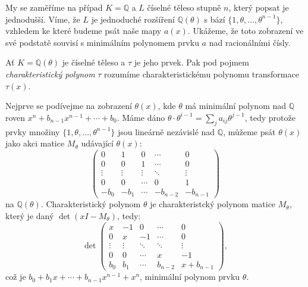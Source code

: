 \documentclass [12pt]{report}
\begin{document}
My se zaměříme na případ $K=\mathbb{Q}$ a $L$ číselné těleso stupně $n$, který popsat je jednodušší. Víme, že $L$ je jednoduché rozšíření $\mathbb{Q}(\theta)$ s bází $\lbrace 1,\theta,\dots,\theta^{n-1} \rbrace$, vzhledem ke které budeme psát naše mapy $a(x)$. Ukážeme, že toto zobrazení ve své podstatě souvisí s minimálním polynomem prvku $a$ nad racionálními čísly.

\begin{definice}
Ať $K = \mathbb{Q}(\theta)$ je číselné těleso a $\tau$ je jeho prvek. Pak pod pojmem \textit{charakteristický polynom} $\tau$ rozumíme charakteristickému polynomu transformace $\tau(x)$. 
\end{definice}

Nejprve se podívejme na zobrazení $\theta(x)$, kde $\theta$ má minimální polynom nad $\mathbb{Q}$ roven $x^n + b_{n-1} x^{n-1} + \cdots + b_0$. Máme dáno $\theta \cdot \theta^{i-1} = \sum_j a_{ij} \theta^{j-1}$, tedy protože prvky množiny $\lbrace 1,\theta,\dots,\theta^{n-1} \rbrace$ jsou lineárně nezávislé nad $\mathbb{Q}$, můžeme psát $\theta(x)$ jako akci matice $M_{\theta}$ udávající $\theta(x)$:
\begin{equation*}
 \begin{pmatrix}
0 & 1 & 0 & \cdots & 0\\
0 & 0 & 1 & \cdots & 0\\
\vdots & \vdots & \vdots & \ddots &\vdots\\
0 & 0 & \cdots & 0& 1\\
-b_0 & -b_1 & \cdots & -b_{n-2} & -b_{n-1}
\end{pmatrix} 
\end{equation*}
na $\mathbb{Q}(\theta)$. Charakteristický polynom $\theta$ je charakteristcký polynom matice $M_\theta$, který je daný $\det (x I - M_{\theta})$,  tedy:
\begin{equation*}
 \det \begin{pmatrix}
x & -1 & 0 & \cdots & 0\\
0 & x & -1 & \cdots & 0\\
\vdots & \vdots & \ddots & \ddots &\vdots\\
0 & 0 & \cdots & x& -1\\
b_0 & b_1 & \cdots & b_{n-2} & x +b_{n-1}
\end{pmatrix} ,
\end{equation*}
což je $b_0 + b_1 x + \cdots + b_{n-1} x^{n-1} + x^n$, minimální polynom prvku $\theta$.\\
\end{document}
